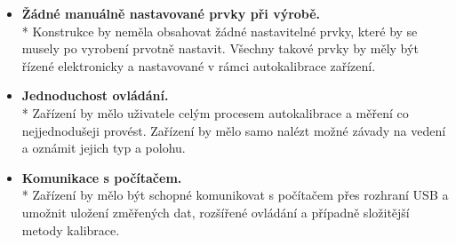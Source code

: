 \begin{itemize}
\item \textbf{Žádné manuálně nastavované prvky při výrobě.}\\*
Konstrukce by neměla obsahovat žádné nastavitelné prvky, které by se musely po vyrobení prvotně nastavit. Všechny takové prvky by měly být řízené elektronicky a nastavované v rámci autokalibrace zařízení.
\item \textbf{Jednoduchost ovládání.}\\*
Zařízení by mělo uživatele celým procesem autokalibrace a měření co nejjednodušeji provést. Zařízení by mělo samo nalézt možné závady na vedení a oznámit jejich typ a polohu.
\item \textbf{Komunikace s počítačem.}\\*
Zařízení by mělo být schopné komunikovat s počítačem přes rozhraní \acrfull{USB} a umožnit uložení změřených dat, rozšířené ovládání a případně složitější metody kalibrace.
\end{itemize}
